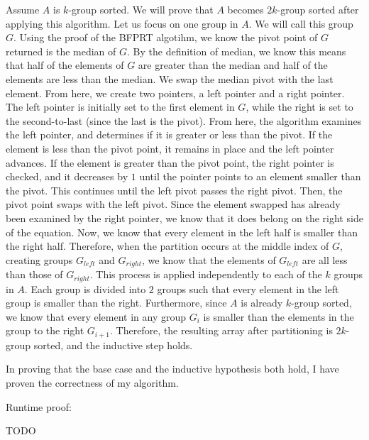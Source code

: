 \documentclass[11pt]{article}
\begin{document}
Assume $A$ is $k$-group sorted. We will prove that $A$ becomes $2k$-group sorted after applying this algorithm. 
Let us focus on one group in $A$. We will call this group $G$. 
Using the proof of the BFPRT algotihm, we know the pivot point of $G$ returned is the median of $G$. 
By the definition of median, we know this means that half of the elements of $G$ are greater than the median and half of the elements are less than the median. 
We swap the median pivot with the last element. From here, we create two pointers, a left pointer and a right pointer. 
The left pointer is initially set to the first element in $G$, while the right is set to the second-to-last (since the last is the pivot).
From here, the algorithm examines the left pointer, and determines if it is greater or less than the pivot. 
If the element is less than the pivot point, it remains in place and the left pointer advances. 
If the element is greater than the pivot point, the right pointer is checked, and it decreases by $1$ until the pointer points to an element smaller than the pivot.  
This continues until the left pivot passes the right pivot. 
Then, the pivot point swaps with the left pivot. 
Since the element swapped has already been examined by the right pointer, we know that it does belong on the right side of the equation. 
Now, we know that every element in the left half is smaller than the right half. 
Therefore, when the partition occurs at the middle index of $G$, creating groups $G_{left}$ and $G_{right}$, 
we know that the elements of $G_{left}$ are all less than those of $G_{right}$. 
This process is applied independently to each of the $k$ groups in $A$. 
Each group is divided into $2$ groups such that every element in the left group is smaller than the right. 
Furthermore, since $A$ is already $k$-group sorted, we know that every element in any group $G_i$ is smaller than the elements in the group to the right $G_{i+1}$. 
Therefore, the resulting array after partitioning is $2k$-group sorted, and the inductive step holds.

In proving that the base case and the inductive hypothesis both hold, I have proven the correctness of my algorithm.

\bigbreak

Runtime proof:

TODO
\end{document}
